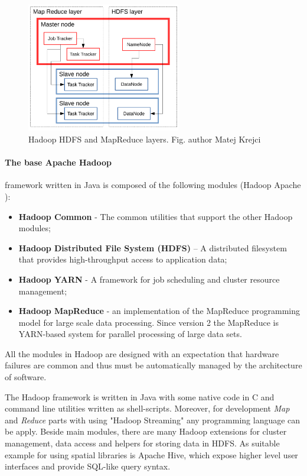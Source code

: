 \documentclass[a4paper,12pt,oneside]{report}
\begin{document}
	\begin{figure}[!htbp]
		\centering
		\includegraphics[width=0.6\textwidth]{./img/schema2.pdf}
		\caption[Hadoop layers]{\centering Hadoop HDFS and MapReduce layers. Fig. author Matej Krejci}
	\end{figure} 
	
	
	
	\paragraph*{The base Apache Hadoop}framework written in Java is composed of the
	following modules (Hadoop Apache \cite{hadoop_web}):
	\begin{itemize}
		\item \textbf{Hadoop Common} - The common utilities that support the other
		Hadoop modules;
		\item \textbf{Hadoop Distributed File System (HDFS)} – A distributed filesystem
		that provides
		high-throughput access to application data;
		\item \textbf{Hadoop YARN} - A framework for job scheduling and cluster resource
		management;
		\item \textbf{Hadoop MapReduce} - an implementation of the MapReduce programming
		model 
		for large scale data processing. Since version 2 the MapReduce is YARN-based system
		 for parallel processing of large data sets.
	\end{itemize}
	All the modules in Hadoop are designed with an expectation that hardware failures
	are common and thus 
	must be automatically managed by the architecture of  software.
	
	The Hadoop framework is written in Java with some native code in C and command
	line utilities written 
	as shell-scripts. Moreover, for development \textit{Map} and \textit{Reduce}
	parts  
	with using "Hadoop Streaming" any programming language can be apply. 
	Beside main modules, there are many Hadoop extensions for cluster management,
	data access and helpers for storing data in HDFS. As suitable example for using spatial libraries is Apache Hive, 
	which expose higher level user interfaces and provide SQL-like query syntax. 
	
\end{document}
